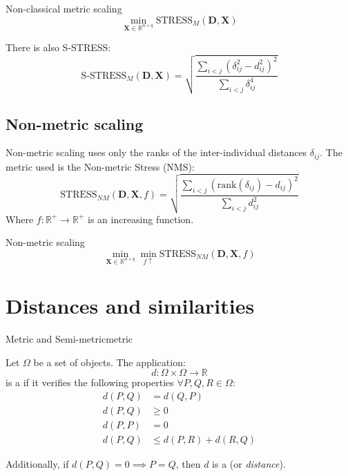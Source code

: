 \begin{problem}{Non-classical metric scaling}{}
\begin{equation*}
	\min_{\boldsymbol{X} \in \mathds{R}^{n\times q}} \text{STRESS}_M(\boldsymbol{D}, \boldsymbol{X})
\end{equation*}
\end{problem}

There is also S-STRESS:
\begin{equation*}
	\text{S-STRESS}_M(\boldsymbol{D}, \boldsymbol{X}) = \sqrt{\frac
		{\sum_{i<j}(\delta_{ij}^2 - d_{ij}^2)^2}
		{\sum_{i<j}\delta_{ij}^4}
	}
\end{equation*}

\subsection{Non-metric scaling}
Non-metric scaling uses only the ranks of the inter-individual distances $\delta_{ij}$.
The metric used is the Non-metric Stress (NMS):
\begin{equation*}
	\text{STRESS}_{NM}(\boldsymbol{D}, \boldsymbol{X}, f) = \sqrt{\frac
	{\sum_{i<j}(\text{rank}(\delta_{ij}) - d_{ij})^2}
	{\sum_{i<j}d_{ij}^2}
	}
\end{equation*}
Where $f: \mathds{R}^+ \to \mathds{R}^+$ is an increasing function.

\begin{problem}{Non-metric scaling}{}
\begin{equation*}
	\min_{\boldsymbol{X} \in \mathds{R}^{n\times q}} \min_{f\uparrow} \text{STRESS}_{NM}(\boldsymbol{D}, \boldsymbol{X}, f)
\end{equation*}
\end{problem}

\section{Distances and similarities}

\begin{definition}{Metric and Semi-metric}{metric}

	Let $\Omega$ be a set of objects. The application:
	\begin{equation*}
		d: \Omega \times \Omega \to \mathds{R}
	\end{equation*}
	is a  if it verifies the following properties $\forall P, Q, R \in \Omega$:
	\begin{align*}
		d(P, Q) & = d(Q, P) \tag{symmetry}                         \\
		d(P, Q) & \geq 0 \tag{non-negativity}                      \\
		d(P, P) & = 0 \tag{identity}                               \\
		d(P, Q) & \leq d(P, R) + d(R, Q) \tag{triangle inequality}
	\end{align*}

	\begin{marker}
		Additionally, if $d(P, Q) = 0 \implies P = Q$, then $d$ is a  (or \emph{distance}).
	\end{marker}
\end{definition}

